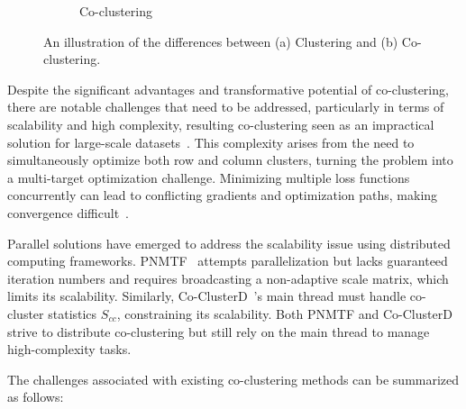 \documentclass[journal]{IEEEtran}
\renewcommand{\cite}[1]{~\autocite{#1}}
\begin{document}
\begin{figure}[htbp]
\begin{subfigure}[b]{0.22\textwidth}
    \caption{Co-clustering}
    \label{fig:cocluster}
  \end{subfigure}
  \caption{An illustration of the differences between (a) Clustering and (b) Co-clustering.}
  \label{fig:cocomparison}
\end{figure}

Despite the significant advantages and transformative potential of co-clustering, there are notable challenges that need to be addressed, particularly in terms of scalability and high complexity, resulting co-clustering seen as an impractical solution for large-scale datasets\cite{cheng2015CoClusterDDistributedFramework}.
This complexity arises from the need to simultaneously optimize both row and column clusters, turning the problem into a multi-target optimization challenge. Minimizing multiple loss functions concurrently can lead to conflicting gradients and optimization paths, making convergence difficult\cite{coello2007EvolutionaryAlgorithmsSolving}.

Parallel solutions have emerged to address the scalability issue using distributed computing frameworks. PNMTF\cite{chen2023ParallelNonNegativeMatrix} attempts parallelization but lacks guaranteed iteration numbers and requires broadcasting a non-adaptive scale matrix, which limits its scalability. Similarly, Co-ClusterD\cite{cheng2015CoClusterDDistributedFramework}'s main thread must handle co-cluster statistics \(S_{cc}\), constraining its scalability. Both PNMTF and Co-ClusterD strive to distribute co-clustering but still rely on the main thread to manage high-complexity tasks.

The challenges associated with existing co-clustering methods can be summarized as follows:
\end{document}
